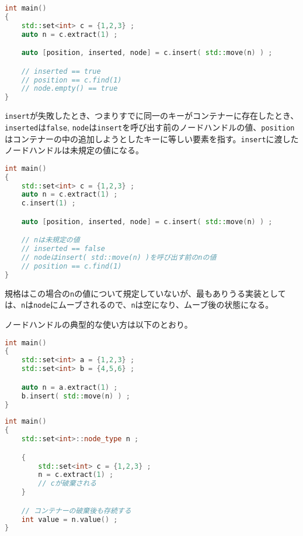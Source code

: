 \begin{lstlisting}[language=C++]
int main()
{
    std::set<int> c = {1,2,3} ;
    auto n = c.extract(1) ;

    auto [position, inserted, node] = c.insert( std::move(n) ) ;

    // inserted == true
    // position == c.find(1)
    // node.empty() == true
}
\end{lstlisting}

\lstinline!insert!が失敗したとき、つまりすでに同一のキーがコンテナーに存在したとき、\lstinline!inserted!は\lstinline!false!,
\lstinline!node!は\lstinline!insert!を呼び出す前のノードハンドルの値、\lstinline!position!はコンテナーの中の追加しようとしたキーに等しい要素を指す。\lstinline!insert!に渡したノードハンドルは未規定の値になる。

\begin{lstlisting}[language=C++]
int main()
{
    std::set<int> c = {1,2,3} ;
    auto n = c.extract(1) ;
    c.insert(1) ;

    auto [position, inserted, node] = c.insert( std::move(n) ) ;

    // nは未規定の値
    // inserted == false
    // nodeはinsert( std::move(n) )を呼び出す前のnの値
    // position == c.find(1)
}
\end{lstlisting}

規格はこの場合の\lstinline!n!の値について規定していないが、最もありうる実装としては、\lstinline!n!は\lstinline!node!にムーブされるので、\lstinline!n!は空になり、ムーブ後の状態になる。

%

ノードハンドルの典型的な使い方は以下のとおり。

%
\noindent
{}

\bgroup
\begin{lstlisting}[language=C++]
int main()
{
    std::set<int> a = {1,2,3} ;
    std::set<int> b = {4,5,6} ;

    auto n = a.extract(1) ;
    b.insert( std::move(n) ) ;
}
\end{lstlisting}
\egroup

%
\noindent
{}

\bgroup
\begin{lstlisting}[language=C++]
int main()
{
    std::set<int>::node_type n ;

    {
        std::set<int> c = {1,2,3} ;
        n = c.extract(1) ;
        // cが破棄される
    }

    // コンテナーの破棄後も存続する
    int value = n.value() ;
}
\end{lstlisting}
\egroup

